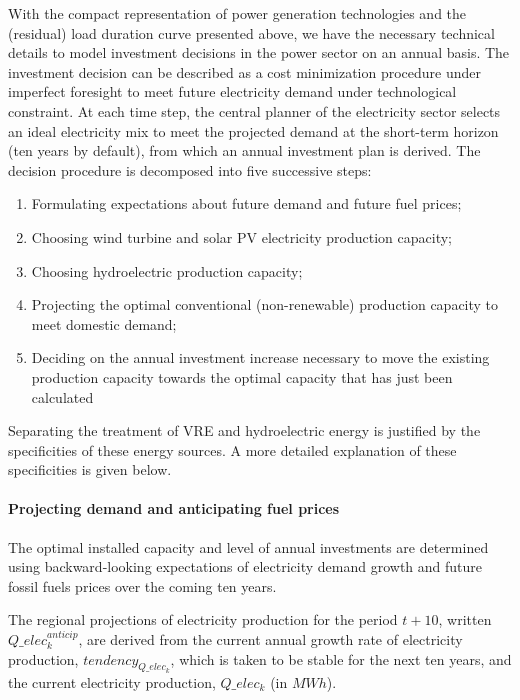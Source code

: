 With the compact representation of power generation technologies and the (residual) load duration curve presented above, we have the necessary technical details to model investment decisions in the power sector on an annual basis.
The investment decision can be described as a cost minimization procedure under imperfect foresight to meet future electricity demand under technological constraint. At each time step, the central planner of the electricity sector selects an ideal electricity mix to meet the projected demand at the short-term horizon (ten years by default), from which an annual investment plan is derived.
The decision procedure is decomposed into five successive steps:
\begin{enumerate}
    \item Formulating expectations about future demand and future fuel prices;
    \item Choosing  wind turbine and solar PV  electricity production capacity;
    \item Choosing hydroelectric production capacity;
    \item Projecting the optimal conventional (non-renewable) production capacity to meet domestic demand;
    \item Deciding on the annual investment increase necessary to move the existing production capacity towards the optimal capacity that has just been calculated
\end{enumerate}

Separating the treatment of VRE and hydroelectric energy is justified by the specificities of these energy sources. A more detailed explanation of these specificities is given below.

\paragraph{Projecting demand and anticipating fuel prices}

The optimal installed capacity and level of annual investments are determined using backward-looking expectations of electricity demand growth and  future fossil fuels prices over the coming ten years.

The regional projections of electricity production for the period $t+10$, written $Q\_elec_k^{anticip}$, are derived from the current annual growth rate of electricity production, $tendency_{Q\_elec_k}$, which is taken to be stable for the next ten years, and the current electricity production, $Q\_elec_k$ (in $MWh$).

